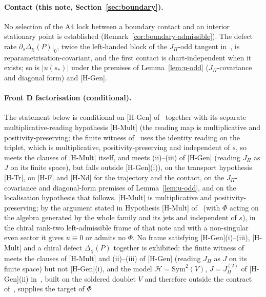 \documentclass[11pt]{article}
\theoremstyle{definition}
\theoremstyle{remark}
\newcommand{\JPi}{J_{\Pi}}
\newcommand{\Dchi}{\Delta_{\chi}}
\begin{document}
    \paragraph{Contact (this note, Section~\ref{sec:boundary}).}
      No selection of the A4 lock between a boundary contact and an interior stationary point is established
      (Remark~\ref{cor:boundary-admissible}).
      The defect rate $\partial_s \Dchi(P)|_0$, twice the left-handed block of the $\JPi$-odd tangent
      in~\cite{Beau2026ebj}, is reparametrisation-covariant, and the first contact is chart-independent when it exists; so is
      $|u(s_*)|$ under the premises of Lemma~\ref{lem:u-odd} ($\JPi$-covariance and diagonal form) and [H-Gen].

    \paragraph{Front D factorisation (conditional).}
      The statement below is conditional on [H-Gen] of~\cite{Beau2026prs} together with its separate multiplicative-reading
      hypothesis [H-Mult] (the reading map is multiplicative and positivity-preserving; the finite witness
      of~\cite{Beau2026ebj} uses the identity reading on the triplet, which is multiplicative, positivity-preserving and independent of $s$, so meets the clauses of [H-Mult] itself, and meets (ii)--(iii) of [H-Gen] (reading $J_\Pi$ as $J$ on its finite space), but falls outside [H-Gen](i)), on the transport hypothesis [H-Tr], on [H-F] and [H-Nd] for the trajectory and the contact, on the $\JPi$-covariance and diagonal-form premises of Lemma~\ref{lem:u-odd}, and on the
      localisation hypothesis that follows.
      [H-Mult] is multiplicative and positivity-preserving; by the argument stated in Hypothesis [H-Mult]
      of~\cite{Beau2026prs} (with $\Phi$ acting on the algebra generated by the whole family and its jets and independent
      of $s$), in the chiral rank-two left-admissible frame of that note and with a non-singular even sector it gives
      $u\equiv0$ or admits no $\Phi$.
      No frame satisfying [H-Gen](i)--(iii), [H-Mult] and a chiral defect $\Dchi(P)$ together is exhibited: the finite witness
      of~\cite{Beau2026ebj} meets the clauses of [H-Mult] and (ii)--(iii) of [H-Gen] (reading $J_\Pi$ as $J$ on its finite space) but not [H-Gen](i), and the model
      $\mathcal H=\mathrm{Sym}^2(V)$, $J=J_\Pi^{(2)}$ of [H-Gen](ii) in~\cite{Beau2026prs}, built on the soldered doublet $V$
      and therefore outside the contract of~\cite{Beau2026q14}, supplies the target of $\Phi$
\end{document}
